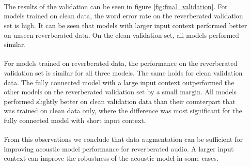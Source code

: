 \\ \\ \\
The results of the validation can be seen in figure \ref{fig:final_validation}. For models trained on clean data, the word error rate on the reverberated validation set is high. It can be seen that models with larger input context performed better on unseen reverberated data. On the clean validation set, all models performed similar. \\ \\
For models trained on reverberated data, the performance on the reverberated validation set is similar for all three models. The same holds for clean validation data. The fully connected model with a large input context outperformed the other models on the reverberated validation set by a small margin. All models performed slightly better on clean validation data than their counterpart that was trained on clean data only, where the difference was most significant for the fully connected model with short input context. \\ \\
From this observations we conclude that data augmentation can be sufficient for improving acoustic model performance for reverberated audio. A larger input context can improve the robustness of the acoustic model in some cases. 
\iffalse
TODO: Describe how we generated reverbed data
TODO: Describe how we tested on reverbed data
TODO: Describe final architecture and results

This chapter should summarize and interpret the results. It should give a clear insight
about which methods did decrease the FER and WER on reverbed and unreverbed data, respectivley.
\fi